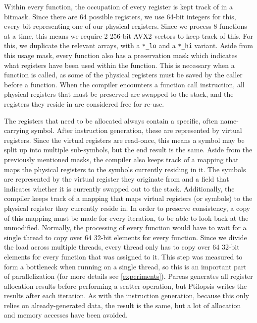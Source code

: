 \documentclass[11pt,dvipsnames]{article}
\newcommand{\mono}[1]{\texttt{#1}}
\begin{document}
Within every function, the occupation of every register is kept track of in a bitmask. Since there are 64 possible registers, we use 64-bit integers for this, every bit representing one of our physical registers. Since we process 8 functions at a time, this means we require 2 256-bit AVX2 vectors to keep track of this. For this, we duplicate the relevant arrays, with a \mono{*\_lo} and a \mono{*\_hi} variant. Aside from this usage mask, every function also has a preservation mask which indicates what registers have been used within the function. This is necessary when a function is called, as some of the physical registers must be saved by the caller before a function. When the compiler encounters a function call instruction, all physical registers that must be preserved are swapped to the stack, and the registers they reside in are considered free for re-use.

The registers that need to be allocated always contain a specific, often name-carrying symbol. After instruction generation, these are represented by virtual registers. Since the virtual registers are read-once, this means a symbol may be split up into multiple sub-symbols, but the end result is the same. Aside from the previously mentioned masks, the compiler also keeps track of a mapping that maps the physical registers to the symbols currently residing in it. The symbols are represented by the virtual register they originate from and a field that indicates whether it is currently swapped out to the stack. Additionally, the compiler keeps track of a mapping that maps virtual registers (or symbols) to the physical register they currently reside in. In order to preserve consistency, a copy of this mapping must be made for every iteration, to be able to look back at the unmodified. Normally, the processing of every function would have to wait for a single thread to copy over 64 32-bit elements for every function. Since we divide the load across multiple threads, every thread only has to copy over 64 32-bit elements for every function that was assigned to it. This step was measured to form a bottleneck when running on a single thread, so this is an important part of parallelization (for more details see \autoref{experiments}). Pareas generates all register allocation results before performing a scatter operation, but Ptilopsis writes the results after each iteration. As with the instruction generation, because this only relies on already-generated data, the result is the same, but a lot of allocation and memory accesses have been avoided.
\end{document}
